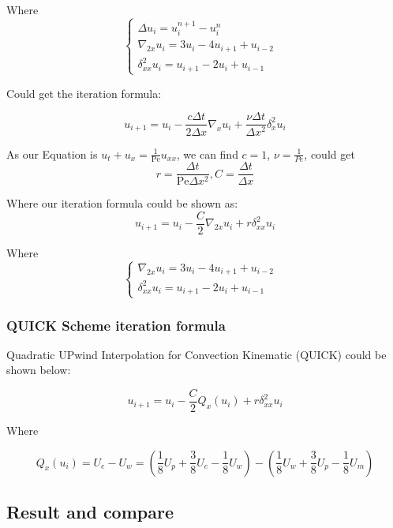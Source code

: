 \documentclass[12pt]{article}
\begin{document}
Where
$$
\begin{cases}
\Delta u_i = u_i^{n+1} - u_i^{n} &\\

\nabla_{2x} u_i = 3 u_i - 4 u_{i+1} + u_{i-2} &\\

\delta^2_{xx} u_i = u_{i+1} - 2 u_i + u_{i-1} &
\end{cases}
$$


Could get the iteration formula:

\[
u_{i+1} = u_i - \frac{c \Delta t}{2 \Delta x} \nabla_x u_i + \frac{\nu \Delta t}{\Delta x^2} \delta^2_x u_i
\]

As our Equation is \( u_t + u_x = \frac{1}{\text{Pe}} u_{xx} \), 
we can find \( c = 1 \),
$\nu = \frac{1}{Pe}$,
could get 
 $$ r = \frac{\Delta t}{\text{Pe}\Delta x^2} ,  C = \frac{\Delta t}{\Delta x} $$

Where our iteration formula could be shown as:
\[
u_{i+1} = u_i - \frac{C}{2} \nabla_{2x} u_i + r \delta^2_{xx} u_i
\]

Where
$$
\begin{cases}
\nabla_{2x} u_i = 3 u_i - 4 u_{i+1} + u_{i-2} &\\
\delta^2_{xx} u_i = u_{i+1} - 2 u_i + u_{i-1} &
\end{cases}
$$


\subsubsection{QUICK Scheme iteration formula}
Quadratic UPwind Interpolation for Convection Kinematic (QUICK)
could be shown below:

\[
u_{i+1} = u_i - \frac{C}{2} Q_x(u_i) + r \delta^2_{xx} u_i
\]


Where

\[
    Q_x(u_i)={U_e - U_w} = \left( \frac{1}{8} U_p + \frac{3}{8} U_e - \frac{1}{8} U_w \right) - \left( \frac{1}{8} U_w + \frac{3}{8} U_p - \frac{1}{8} U_m \right)
\]

                                                                                        

\subsection{Result and compare}
\end{document}
